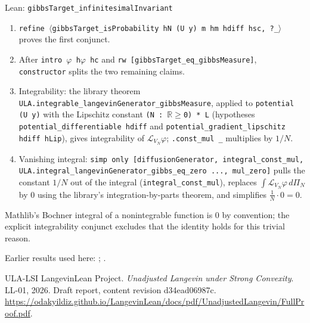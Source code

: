 \documentclass[11pt,a4paper]{article}
\begin{document}
\begin{leanbox}{Lean: \texttt{gibbsTarget\_\allowbreak{}infinitesimalInvariant}}
\begin{enumerate}


\item \texttt{refine \ensuremath{\langle}gibbs\allowbreak{}Target\_\allowbreak{}is\allowbreak{}Probability h\allowbreak{}N (U y) m hm hdiff hsc, ?\_\allowbreak{}\ensuremath{\rangle}} proves the first conjunct.

\item After \texttt{intro \ensuremath{\varphi} h\ensuremath{\varphi} hc} and \texttt{rw [gibbs\allowbreak{}Target\_\allowbreak{}eq\_\allowbreak{}gibbs\allowbreak{}Measure]}, \texttt{constructor} splits the two remaining claims.

\item Integrability: the library theorem \texttt{ULA.\allowbreak{}integrable\_\allowbreak{}langevin\allowbreak{}Generator\_\allowbreak{}gibbs\allowbreak{}Measure}, applied to \texttt{potential (U y)} with the Lipschitz constant \texttt{(N : \ensuremath{\mathbb R}\ensuremath{\ge}0) * L} (hypotheses \texttt{potential\_\allowbreak{}differentiable hdiff} and \texttt{potential\_\allowbreak{}gradient\_\allowbreak{}lipschitz hdiff h\allowbreak{}Lip}), gives integrability of \(\mathcal L_{V_N}\varphi\); \texttt{.\allowbreak{}const\_\allowbreak{}mul \_\allowbreak{}} multiplies by \(1/N\).

\item Vanishing integral: \texttt{simp only [diffusion\allowbreak{}Generator, integral\_\allowbreak{}const\_\allowbreak{}mul, ULA.\allowbreak{}integral\_\allowbreak{}langevin\allowbreak{}Generator\_\allowbreak{}gibbs\_\allowbreak{}eq\_\allowbreak{}zero .\allowbreak{}.\allowbreak{}.\allowbreak{}, mul\_\allowbreak{}zero]} pulls the constant \(1/N\) out of the integral (\texttt{integral\_\allowbreak{}const\_\allowbreak{}mul}), replaces \(\int\mathcal L_{V_N}\varphi\,d\Pi_N\) by \(0\) using the library's integration-by-parts theorem, and simplifies \(\frac1N\cdot0=0\).

\end{enumerate}



Mathlib's Bochner integral of a nonintegrable function is \(0\) by convention; the explicit integrability conjunct excludes that the identity holds for this trivial reason.
\end{leanbox}


Earlier results used here: \cite[Section~3.46.11]{LangevinLean2026ULASC}; \cite[Section~3.46.13]{LangevinLean2026ULASC}.

\begin{thebibliography}{ULA-LSI}
LangevinLean Project. \emph{Unadjusted Langevin under Strong Convexity}. LL-01, 2026. Draft report, content revision d34ead06987c. \url{https://odakyildiz.github.io/LangevinLean/docs/pdf/UnadjustedLangevin/FullProof.pdf}.
\end{thebibliography}
\end{document}

